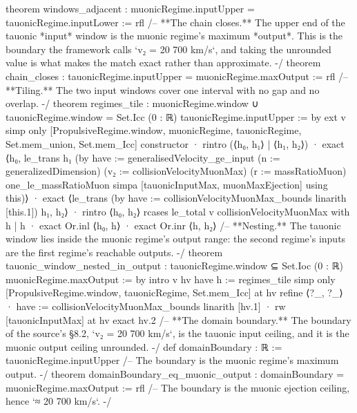 \documentclass[11pt,a4paper]{article}
\begin{document}
{theorem windows\_\allowbreak{}adjacent : muonicRegime.inputUpper = tauonicRegime.inputLower := rfl
\mbox{}
/-- **The chain closes.**  The upper end of the tauonic *input* window is the
muonic regime's maximum *output*.  This is the boundary the framework calls
`v₂ = 20 700 km/s`, and taking the unrounded value is what makes the match
exact rather than approximate. -/
theorem chain\_\allowbreak{}closes : tauonicRegime.inputUpper = muonicRegime.maxOutput := rfl
\mbox{}
/-- **Tiling.**  The two input windows cover one interval with no gap and no
overlap. -/
theorem regimes\_\allowbreak{}tile :
    muonicRegime.window ∪ tauonicRegime.window
      = Set.Icc (0 : ℝ) tauonicRegime.inputUpper := by
  ext v
  simp only [PropulsiveRegime.window, muonicRegime, tauonicRegime, Set.mem\_\allowbreak{}union,
    Set.mem\_\allowbreak{}Icc]
  constructor
  · rintro (⟨h₀, h₁⟩ | ⟨h₁, h₂⟩)
    · exact ⟨h₀, le\_\allowbreak{}trans h₁ (by
        have := generalisedVelocity\_\allowbreak{}ge\_\allowbreak{}input (n := generalizedDimension)
          (v₂ := collisionVelocityMuonMax) (r := massRatioMuon) one\_\allowbreak{}le\_\allowbreak{}massRatioMuon
        simpa [tauonicInputMax, muonMaxEjection] using this)⟩
    · exact ⟨le\_\allowbreak{}trans (by
        have := collisionVelocityMuonMax\_\allowbreak{}bounds
        linarith [this.1]) h₁, h₂⟩
  · rintro ⟨h₀, h₂⟩
    rcases le\_\allowbreak{}total v collisionVelocityMuonMax with h | h
    · exact Or.inl ⟨h₀, h⟩
    · exact Or.inr ⟨h, h₂⟩
\mbox{}
/-- **Nesting.**  The tauonic window lies inside the muonic regime's output
range: the second regime's inputs are the first regime's reachable outputs. -/
theorem tauonic\_\allowbreak{}window\_\allowbreak{}nested\_\allowbreak{}in\_\allowbreak{}output :
    tauonicRegime.window ⊆ Set.Ioc (0 : ℝ) muonicRegime.maxOutput := by
  intro v hv
  have h := regimes\_\allowbreak{}tile
  simp only [PropulsiveRegime.window, tauonicRegime, Set.mem\_\allowbreak{}Icc] at hv
  refine ⟨?\_\allowbreak{}, ?\_\allowbreak{}⟩
  · have := collisionVelocityMuonMax\_\allowbreak{}bounds
    linarith [hv.1]
  · rw [tauonicInputMax] at hv
    exact hv.2
\mbox{}
/-- **The domain boundary.**  The boundary of the source's §8.2, `v₂ = 20 700 km/s`,
is the tauonic input ceiling, and it is the muonic output ceiling unrounded. -/
def domainBoundary : ℝ := tauonicRegime.inputUpper
\mbox{}
/-- The boundary is the muonic regime's maximum output. -/
theorem domainBoundary\_\allowbreak{}eq\_\allowbreak{}muonic\_\allowbreak{}output : domainBoundary = muonicRegime.maxOutput := rfl
\mbox{}
/-- The boundary is the muonic ejection ceiling, hence `≈ 20 700 km/s`. -/
}
\end{document}
